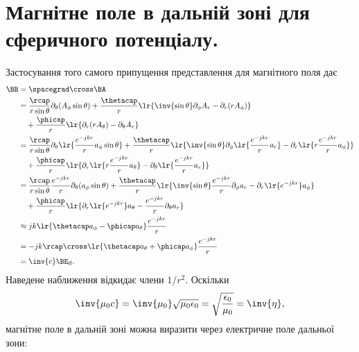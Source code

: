 \section{Магнітне поле в дальній зоні для сферичного потенціалу.}
Застосування того самого припущення представлення для магнітного поля дає
\begin{equation}\label{eqn:chapter4Notes:220}
\begin{aligned}
\BB
&=
\spacegrad \cross \BA
\\ &=
\frac{\rcap}{r \sin\theta} \partial_\theta (A_\phi \sin\theta)
+ \frac{\thetacap}{r} \lr{\inv{\sin\theta} \partial_\phi A_r - \partial_r (r A_\phi)} \\
&\quad + \frac{\phicap}{r} \lr{\partial_r (r A_\theta) - \partial_\theta A_r}
\\ &=
\frac{\rcap}{r \sin\theta} \partial_\theta \lr{
\frac{e^{-j k r}}{r} a_\phi
\sin\theta}
+ \frac{\thetacap}{r} \lr{\inv{\sin\theta} \partial_\phi \lr{
\frac{e^{-j k r}}{r} a_r
} - \partial_r \lr{r
\frac{e^{-j k r}}{r} a_\phi
}
} \\
&\quad + \frac{\phicap}{r} \lr{\partial_r \lr{r
\frac{e^{-j k r}}{r} a_\theta
} - \partial_\theta
\lr{
\frac{e^{-j k r}}{r} a_r
}
}
\\ &=
\frac{\rcap}{r \sin\theta}
\frac{e^{-j k r}}{r}
\partial_\theta (a_\phi \sin\theta)
+ \frac{\thetacap}{r} \lr{\inv{\sin\theta}
\frac{e^{-j k r}}{r}
\partial_\phi
a_r
- \partial_r \lr{
e^{-j k r}
}
a_\phi
} \\
&\quad + \frac{\phicap}{r} \lr{
\partial_r
\lr{
e^{-j k r}
}
a_\theta
-
\frac{e^{-j k r}}{r}
\partial_\theta
a_r
} \\
&\approx
j k \lr{\thetacap a_\phi - \phicap a_\theta}
\frac{e^{-j k r}}{r}
\\ &=
-j k \rcap \cross \lr{
\thetacap a_\theta
+ \phicap a_\phi
}
\frac{e^{-j k r}}{r}
\\ &=
\inv{c} \BE_{\textrm{ff}}.
\end{aligned}
\end{equation}
Наведене наближення відкидає члени \(1/r^2\). Оскільки
\begin{equation}\label{eqn:chapter4Notes:240}
\inv{\mu_0 c} = \inv{\mu_0} \sqrt{\mu_0\epsilon_0} = \sqrt{\frac{\epsilon_0}{\mu_0}} = \inv{\eta},
\end{equation}
магнітне поле в дальній зоні можна виразити через електричне поле дальньої зони:

